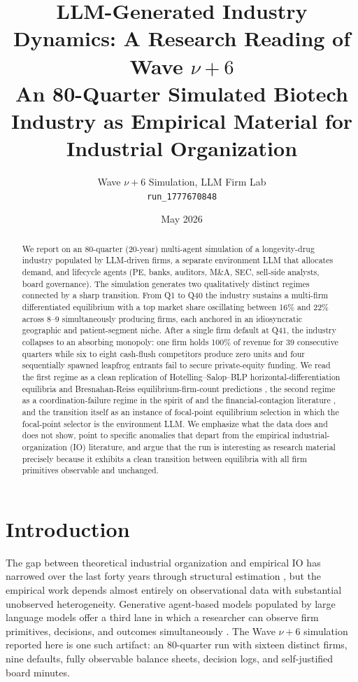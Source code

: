 \documentclass[11pt]{article}
\title{\textbf{LLM-Generated Industry Dynamics: A Research Reading of Wave $\nu+6$}\\[0.3em]
\large An 80-Quarter Simulated Biotech Industry as Empirical Material for Industrial Organization}
\author{Wave $\nu+6$ Simulation, LLM Firm Lab \\ \texttt{run\_1777670848}}
\date{May 2026}
\begin{document}
\maketitle

\begin{abstract}
\noindent
We report on an 80-quarter (20-year) multi-agent simulation of a longevity-drug industry populated by LLM-driven firms, a separate environment LLM that allocates demand, and lifecycle agents (PE, banks, auditors, M\&A, SEC, sell-side analysts, board governance). The simulation generates two qualitatively distinct regimes connected by a sharp transition. From Q1 to Q40 the industry sustains a multi-firm differentiated equilibrium with a top market share oscillating between 16\% and 22\% across 8--9 simultaneously producing firms, each anchored in an idiosyncratic geographic and patient-segment niche. After a single firm default at Q41, the industry collapses to an absorbing monopoly: one firm holds 100\% of revenue for 39 consecutive quarters while six to eight cash-flush competitors produce zero units and four sequentially spawned leapfrog entrants fail to secure private-equity funding. We read the first regime as a clean replication of Hotelling--Salop--BLP horizontal-differentiation equilibria \citep{Hotelling1929,Salop1979,BerryLevinsohnPakes1995} and Bresnahan-Reiss equilibrium-firm-count predictions \citep{BresnahanReiss1991}, the second regime as a coordination-failure regime in the spirit of \citet{CooperJohn1988} and the financial-contagion literature \citep{DiamondDybvig1983,AllenGale2000}, and the transition itself as an instance of focal-point equilibrium selection \citep{Schelling1960,MailathPostlewaite1990} in which the focal-point selector is the environment LLM. We emphasize what the data does and does not show, point to specific anomalies that depart from the empirical industrial-organization (IO) literature, and argue that the run is interesting as research material precisely because it exhibits a clean transition between equilibria with all firm primitives observable and unchanged.
\end{abstract}

\section{Introduction}

The gap between theoretical industrial organization and empirical IO has narrowed over the last forty years through structural estimation \citep{BerryLevinsohnPakes1995,Nevo2001,EricsonPakes1995,BerryHaileSurvey2014}, but the empirical work depends almost entirely on observational data with substantial unobserved heterogeneity. Generative agent-based models populated by large language models offer a third lane in which a researcher can observe firm primitives, decisions, and outcomes simultaneously \citep{Park2023,Argyle2023,Horton2023}. The Wave $\nu+6$ simulation reported here is one such artifact: an 80-quarter run with sixteen distinct firms, nine defaults, fully observable balance sheets, decision logs, and self-justified board minutes.
\end{document}
